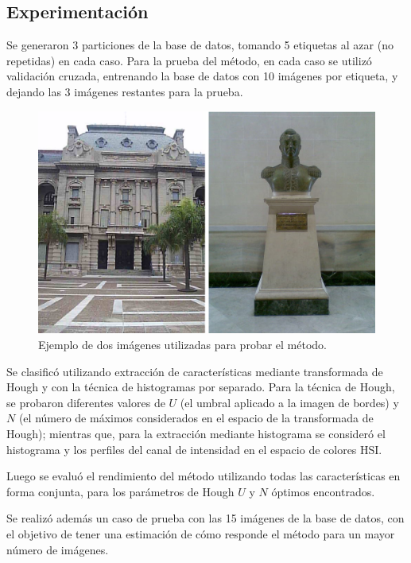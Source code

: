 \documentclass[conference,a4paper,10pt,oneside,final]{tfmpd}
\begin{document}
\subsection*{Experimentación}
Se generaron 3 particiones de la base de datos, tomando
5 etiquetas al azar (no repetidas) en cada caso.
Para la prueba del método, {en cada caso} se utilizó validación cruzada,
entrenando la base de datos con 10 imágenes por etiqueta, y dejando las 3
imágenes restantes para la prueba.

\begin{figure}
\begin{center}
\includegraphics[scale=0.25]{../diagramas/dibujo}
\end{center}
\caption{Ejemplo de dos imágenes utilizadas para probar el método.}
\label{imagenes}
\end{figure}

Se clasificó utilizando extracción de características mediante
transformada de Hough y con la técnica de histogramas por separado.
Para la técnica de Hough, se probaron diferentes valores de $U$ (el umbral
aplicado a la imagen de bordes) y $N$ (el número de máximos considerados
en el espacio de la transformada de Hough); mientras que,
para la extracción mediante histograma se consideró el histograma y los perfiles
del canal de intensidad en el espacio de colores HSI.

Luego se evaluó el rendimiento del método utilizando todas las características
en forma conjunta, para los parámetros de Hough $U$ y $N$ óptimos encontrados.

Se realizó además un {caso de prueba} con las 15 %
imágenes de la base de datos, %
 con el objetivo de tener una estimación de cómo responde
el método para un mayor número de imágenes.
\end{document}
